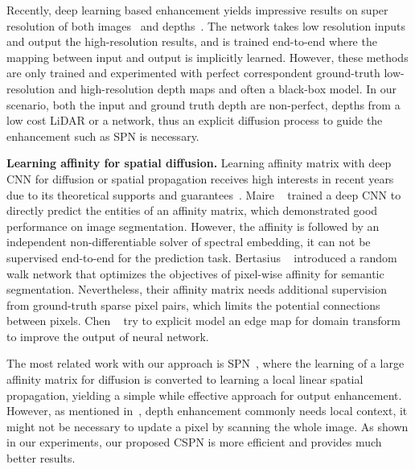 Recently, deep learning based enhancement yields impressive results on super resolution of both images~\cite{dong2014learning,yang2014color} and depths~\cite{song2016deep,hui2016depth,kwon2015data,riegler2016atgv}. The network takes low resolution inputs and output the high-resolution results, and is trained end-to-end where the mapping between input and output is implicitly learned.
However, these methods are only trained and experimented with perfect correspondent ground-truth low-resolution and high-resolution depth maps and often a black-box model. In our scenario, both the input and ground truth depth are non-perfect, \eg depths from a low cost LiDAR or a network, thus an explicit diffusion process to guide the enhancement such as SPN is necessary.

\noindent\textbf{Learning affinity for spatial diffusion.}
Learning affinity matrix with deep CNN for diffusion or spatial propagation receives high interests in recent years due to its theoretical supports and guarantees~\cite{weickert1998anisotropic}.
Maire \etal~\cite{maire2016affinity} trained a deep CNN to directly predict the entities of an affinity matrix, which demonstrated good performance on image segmentation. However, the affinity is followed by an independent non-differentiable solver of spectral embedding, it can not be supervised end-to-end for the prediction task. Bertasius \etal~\cite{bertasius2016convolutional} introduced a random walk network that optimizes the objectives of pixel-wise affinity for semantic segmentation. Nevertheless, their affinity matrix needs additional supervision from ground-truth sparse pixel pairs, which limits the potential connections between pixels. Chen \etal~\cite{chen2016semantic} try to explicit model an edge map for domain transform to improve the output of neural network. 

The most related work with our approach is SPN~\cite{liu2017learning}, where the learning of a large affinity matrix for diffusion is converted to learning a local linear spatial propagation, yielding a simple while effective approach for output enhancement. However, as mentioned in~, depth enhancement commonly needs local context, it might not be necessary to update a pixel by scanning the whole image. As shown in our experiments, our proposed CSPN is more efficient and provides much better results.

